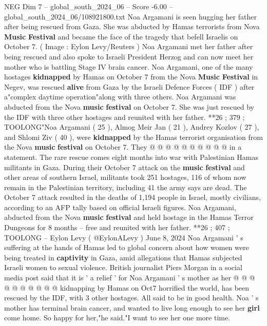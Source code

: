 \begin{textsample}{NEG Dim 7 – global\_south\_2024\_06 – Score -6.00 – global\_south\_2024\_06/108921800.txt}  \label{ex:f7_neg_365}
Noa Argamani is seen hugging her father after being rescued from Gaza.
She was abducted by Hamas terrorists from Nova \textbf{Music} \textbf{Festival} and became the face of the tragedy that befell Israelis on October 7. ( Image : Eylon Levy/Reuters ) Noa Argamani met her father after being rescued and also spoke to Israeli President Herzog and can now meet her mother who is battling Stage IV brain cancer.
Noa Argamani, one of the many hostages \textbf{kidnapped} by Hamas on October 7 from the Nova \textbf{Music} \textbf{Festival} in Negev, was rescued \textbf{alive} from Gaza by the Israeli Defence Forces ( IDF ) after a"complex daytime operation"along with three others.
Noa Argamani was abducted from the Nova \textbf{music} \textbf{festival} on October 7.
She was just rescued by the IDF with three other hostages and reunited with her father. **26 ; 379 ; TOOLONG"Noa Argamani ( 25 ), Almog Meir Jan ( 21 ), Andrey Kozlov ( 27 ), and Shlomi Ziv ( 40 ), were \textbf{kidnapped} by the Hamas terrorist organisation from the Nova \textbf{music} \textbf{festival} on October 7.
They @ @ @ @ @ @ @ @ @ @ in a statement.
The rare rescue comes eight months into war with Palestinian Hamas militants in Gaza.
During their October 7 attack on the \textbf{music} \textbf{festival} and other areas of southern Israel, militants took 251 hostages, 116 of whom now remain in the Palestinian territory, including 41 the army says are dead.
The October 7 attack resulted in the deaths of 1,194 people in Israel, mostly civilians, according to an AFP tally based on official Israeli figures.
Noa Argamani, abducted from the Nova \textbf{music} \textbf{festival} and held hostage in the Hamas Terror Dungeons for 8 months -- free and reunited with her father. **26 ; 407 ; TOOLONG -- Eylon Levy ( @EylonALevy ) June 8, 2024 Noa Argamani ' s suffering at the hands of Hamas led to global concern about how women were being treated in \textbf{captivity} in Gaza, amid allegations that Hamas subjected Israeli women to sexual violence.
British journalist Piers Morgan in a social media post said that it is ' a relief ' for Noa Argamani ' s mother as her @ @ @ @ @ @ @ @ @ @ kidnapping by Hamas on Oct7 horrified the world, has been rescued by the IDF, with 3 other hostages.
All said to be in good health.
Noa ' s mother has terminal brain cancer, and wanted to live long enough to see her \textbf{girl} come home.
So happy for her,"he said."I want to see her one more time.

\end{textsample}
